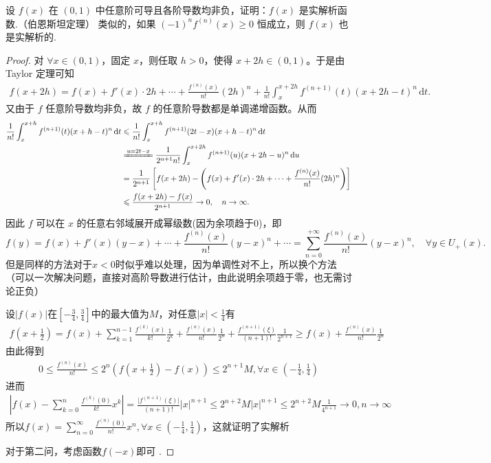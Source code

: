 \documentclass[../../main.tex]{subfiles}
\begin{document}
\begin{example}
设 \( f(x) \) 在 \( (0,1) \) 中任意阶可导且各阶导数均非负，证明：\( f(x) \) 是实解析函数.（伯恩斯坦定理） 
类似的，如果 \( (-1)^n f^{(n)}(x) \geqslant  0 \) 恒成立，则 \( f(x) \) 也是实解析的. 
\end{example}
\begin{proof}
对 \(\forall x \in (0,1)\)，固定 \(x\)，则任取 \(h>0\)，使得 \(x+2h \in (0,1)\)。于是由 Taylor 定理可知
\begin{align*}
f(x+2h) = f(x) + f'(x) \cdot 2h + \cdots + \frac{f^{(n)}(x)}{n!} (2h)^n + \frac{1}{n!} \int_x^{x+2h} f^{(n+1)}(t) (x+2h-t)^n \, \mathrm{d}t.
\end{align*}
又由于 \(f\) 任意阶导数均非负，故 \(f\) 的任意阶导数都是单调递增函数。从而
\begin{align*}
\frac{1}{n!} \int_x^{x+h} f^{(n+1)}(t) (x+h-t)^n \, \mathrm{d}t &\leqslant \frac{1}{n!} \int_x^{x+h} f^{(n+1)}(2t-x) (x+h-t)^n \, \mathrm{d}t \\
&\xlongequal{u=2t-x} \frac{1}{2^{n+1} n!} \int_x^{x+2h} f^{(n+1)}(u) (x+2h-u)^n \, \mathrm{d}u \\
&= \frac{1}{2^{n+1}} \left[ f(x+2h) - \left( f(x) + f'(x) \cdot 2h + \cdots + \frac{f^{(n)}(x)}{n!} (2h)^n \right) \right] \\
&\leqslant \frac{f(x+2h) - f(x)}{2^{n+1}} \to 0, \quad n \to \infty.
\end{align*}
因此 \(f\) 可以在 \(x\) 的任意右邻域展开成幂级数(因为余项趋于0)，即
\[
f(y) = f(x) + f'(x) (y-x) + \cdots + \frac{f^{(n)}(x)}{n!} (y-x)^n + \cdots = \sum_{n=0}^{+\infty} \frac{f^{(n)}(x)}{n!} (y-x)^n, \quad \forall y \in U_+(x).
\]
但是同样的方法对于\(x < 0\)时似乎难以处理，因为单调性对不上，所以换个方法（可以一次解决问题，直接对高阶导数进行估计，由此说明余项趋于零，也无需讨论正负）

设\(\vert f(x)\vert\)在\([-\frac{3}{4},\frac{3}{4}]\)中的最大值为\(M\)，对任意\(\vert x\vert<\frac{1}{4}\)有
\begin{align*}
f\left(x + \frac{1}{2}\right)=f(x)+\sum_{k = 1}^{n - 1}\frac{f^{(k)}(x)}{k!}\frac{1}{2^{k}}+\frac{f^{(n)}(x)}{n!}\frac{1}{2^{n}}+\frac{f^{(n + 1)}(\xi)}{(n + 1)!}\frac{1}{2^{n + 1}}\geqslant  f(x)+\frac{f^{(n)}(x)}{n!}\frac{1}{2^{n}}
\end{align*}
由此得到
\begin{align*}
0\leqslant \frac{f^{(n)}(x)}{n!}\leqslant  2^{n}\left(f\left(x+\frac{1}{2}\right)-f(x)\right)\leqslant  2^{n + 1}M,\forall x\in\left(-\frac{1}{4},\frac{1}{4}\right)
\end{align*}
进而
\begin{align*}
\left\vert f(x)-\sum_{k = 0}^{n}\frac{f^{(k)}(0)}{k!}x^{k}\right\vert=\frac{\vert f^{(n + 1)}(\xi)\vert}{(n + 1)!}\vert x\vert^{n + 1}\leqslant  2^{n + 2}M\vert x\vert^{n + 1}\leqslant  2^{n + 2}M\frac{1}{4^{n + 1}}\to 0,n\to\infty
\end{align*}
所以\(f(x)=\sum_{n = 0}^{\infty}\frac{f^{(n)}(0)}{n!}x^{n},\forall x\in\left(-\frac{1}{4},\frac{1}{4}\right)\)，这就证明了实解析

对于第二问，考虑函数\(f(-x)\)即可 .
\end{proof}
\end{document}
